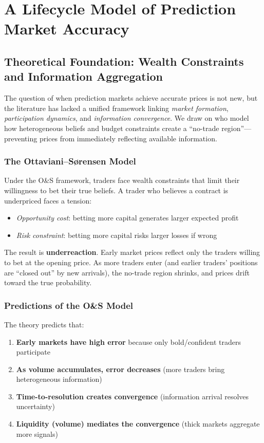 \documentclass[12pt,letterpaper]{article}
\begin{document}
\clearpage
\section{A Lifecycle Model of Prediction Market Accuracy}\label{sec:theory}

\subsection{Theoretical Foundation: Wealth Constraints and Information Aggregation}

The question of when prediction markets achieve accurate prices is not new, but the literature has lacked a unified framework linking \textit{market formation}, \textit{participation dynamics}, and \textit{information convergence}. We draw on \citet{ottaviani2007outcomes, ottaviani2010noise} who model how heterogeneous beliefs and budget constraints create a ``no-trade region''---preventing prices from immediately reflecting available information.

\subsubsection{The Ottaviani--S{\o}rensen Model}

Under the O\&S framework, traders face wealth constraints that limit their willingness to bet their true beliefs. A trader who believes a contract is underpriced faces a tension:
\begin{itemize}
    \item \textit{Opportunity cost}: betting more capital generates larger expected profit
    \item \textit{Risk constraint}: betting more capital risks larger losses if wrong
\end{itemize}

The result is \textbf{underreaction}. Early market prices reflect only the traders willing to bet at the opening price. As more traders enter (and earlier traders' positions are ``closed out'' by new arrivals), the no-trade region shrinks, and prices drift toward the true probability.

\subsubsection{Predictions of the O\&S Model}

The theory predicts that:
\begin{enumerate}
    \item \textbf{Early markets have high error} because only bold/confident traders participate
    \item \textbf{As volume accumulates, error decreases} (more traders bring heterogeneous information)
    \item \textbf{Time-to-resolution creates convergence} (information arrival resolves uncertainty)
    \item \textbf{Liquidity (volume) mediates the convergence} (thick markets aggregate more signals)
\end{enumerate}
\end{document}
